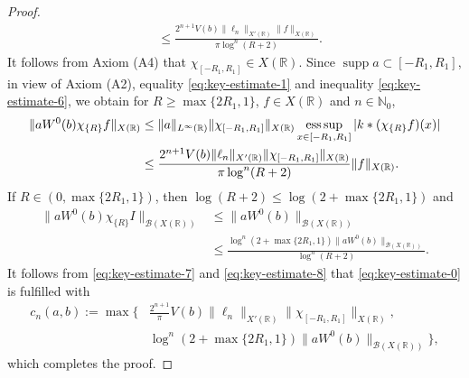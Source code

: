\documentclass[reqno]{amsproc}
\newcommand{\cB}{\mathcal{B}}
\newcommand{\N}{\mathbb{N}}
\newcommand{\R}{\mathbb{R}}
\theoremstyle{definition}
\theoremstyle{remark}
\numberwithin{equation}{section}
\begin{document}
\begin{proof}
\begin{align}
&\le 
\frac{2^{n+1}V(b)\|\ell_n\|_{X'(\R)}\|f\|_{X(\R)}}{\pi\log^n(R+2)}.
\label{eq:key-estimate-6}
\end{align}
It follows from Axiom (A4) that $\chi_{[-R_1,R_1]}\in X(\R)$.
Since $\operatorname{supp}a\subset[-R_1,R_1]$, in view of Axiom (A2), 
equality \eqref{eq:key-estimate-1} and inequality \eqref{eq:key-estimate-6},
we obtain for $R\ge\max\{2R_1,1\}$, $f\in X(\R)$ and $n\in\N_0$,
\begin{align}
\|aW^0(b)\chi_{\{R\}}f\|_{X(\R)}
&\le 
\|a\|_{L^\infty(\R)}\|\chi_{[-R_1,R_1]}\|_{X(\R)}
\operatornamewithlimits{ess\,sup}_{x\in[-R_1,R_1]}|k*(\chi_{\{R\}}f)(x)|
\nonumber\\
&\le 
\frac{2^{n+1}V(b)\|\ell_n\|_{X'(\R)}\|\chi_{[-R_1,R_1]}\|_{X(\R)}}
{\pi\log^n(R+2)}
\|f\|_{X(\R)}.
\label{eq:key-estimate-7}
\end{align}
If $R\in(0,\max\{2R_1,1\})$, then
$\log(R+2)\le\log(2+\max\{2R_1,1\})$ and
\begin{align}
\|aW^0(b)\chi_{\{R\}}I\|_{\cB(X(\R))}
&\le 
\|aW^0(b)\|_{\cB(X(\R))}
\nonumber\\
&\le 
\frac{\log^n(2+\max\{2R_1,1\})\|aW^0(b)\|_{\cB(X(\R))}}{\log^n(R+2)}.
\label{eq:key-estimate-8}
\end{align}
It follows from \eqref{eq:key-estimate-7} and \eqref{eq:key-estimate-8}
that \eqref{eq:key-estimate-0} is fulfilled with
\begin{align*}
c_n(a,b):=\max\bigg\{ &
\frac{2^{n+1}}{\pi}V(b)\|\ell_n\|_{X'(\R)}\|\chi_{[-R_1,R_1]}\|_{X(\R)},
\\
&
\log^n(2+\max\{2R_1,1\})\|aW^0(b)\|_{\cB(X(\R))}\bigg\},
\end{align*}
which completes the proof.
\end{proof}
\end{document}
